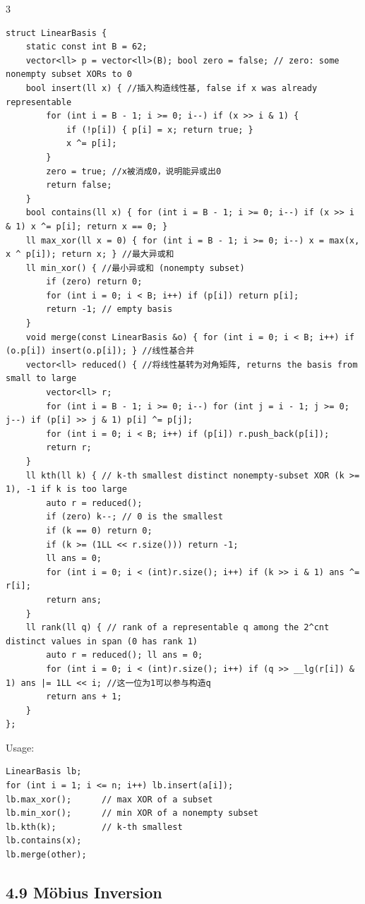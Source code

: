 \documentclass[8pt]{extarticle}
\begin{document}
\begin{multicols*}{3}
\begin{lstlisting}
struct LinearBasis {
    static const int B = 62;
    vector<ll> p = vector<ll>(B); bool zero = false; // zero: some nonempty subset XORs to 0
    bool insert(ll x) { //插入构造线性基, false if x was already representable
        for (int i = B - 1; i >= 0; i--) if (x >> i & 1) {
            if (!p[i]) { p[i] = x; return true; }
            x ^= p[i];
        }
        zero = true; //x被消成0，说明能异或出0
        return false;
    }
    bool contains(ll x) { for (int i = B - 1; i >= 0; i--) if (x >> i & 1) x ^= p[i]; return x == 0; }
    ll max_xor(ll x = 0) { for (int i = B - 1; i >= 0; i--) x = max(x, x ^ p[i]); return x; } //最大异或和
    ll min_xor() { //最小异或和 (nonempty subset)
        if (zero) return 0;
        for (int i = 0; i < B; i++) if (p[i]) return p[i];
        return -1; // empty basis
    }
    void merge(const LinearBasis &o) { for (int i = 0; i < B; i++) if (o.p[i]) insert(o.p[i]); } //线性基合并
    vector<ll> reduced() { //将线性基转为对角矩阵, returns the basis from small to large
        vector<ll> r;
        for (int i = B - 1; i >= 0; i--) for (int j = i - 1; j >= 0; j--) if (p[i] >> j & 1) p[i] ^= p[j];
        for (int i = 0; i < B; i++) if (p[i]) r.push_back(p[i]);
        return r;
    }
    ll kth(ll k) { // k-th smallest distinct nonempty-subset XOR (k >= 1), -1 if k is too large
        auto r = reduced();
        if (zero) k--; // 0 is the smallest
        if (k == 0) return 0;
        if (k >= (1LL << r.size())) return -1;
        ll ans = 0;
        for (int i = 0; i < (int)r.size(); i++) if (k >> i & 1) ans ^= r[i];
        return ans;
    }
    ll rank(ll q) { // rank of a representable q among the 2^cnt distinct values in span (0 has rank 1)
        auto r = reduced(); ll ans = 0;
        for (int i = 0; i < (int)r.size(); i++) if (q >> __lg(r[i]) & 1) ans |= 1LL << i; //这一位为1可以参与构造q
        return ans + 1;
    }
};
\end{lstlisting}

Usage:

\begin{lstlisting}
LinearBasis lb;
for (int i = 1; i <= n; i++) lb.insert(a[i]);
lb.max_xor();      // max XOR of a subset
lb.min_xor();      // min XOR of a nonempty subset
lb.kth(k);         // k-th smallest
lb.contains(x);
lb.merge(other);
\end{lstlisting}

\subsection*{4.9 Möbius Inversion}


\end{multicols*}
\end{document}

